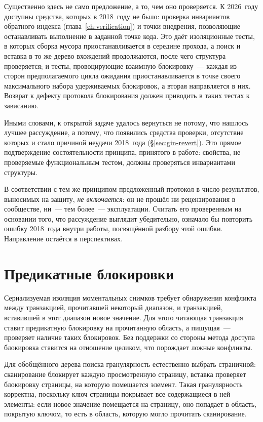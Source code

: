 Существенно здесь не само предложение, а то, чем оно проверяется. К 2026~году
доступны средства, которых в 2018~году не было: проверка инвариантов обратного
индекса (глава~\ref{ch:verification}) и точки внедрения, позволяющие
останавливать выполнение в заданной точке кода. Это даёт изоляционные тесты,
в которых сборка мусора приостанавливается в середине прохода, а поиск и
вставка в то же дерево вхождений продолжаются, после чего структура
проверяется; и тесты, провоцирующие взаимную блокировку~--- каждая из сторон
предполагаемого цикла ожидания приостанавливается в точке своего максимального
набора удерживаемых блокировок, а вторая направляется в них. Возврат к дефекту
протокола блокирования должен приводить в таких тестах к зависанию.

Иными словами, к открытой задаче удалось вернуться не потому, что нашлось
лучшее рассуждение, а потому, что появились средства проверки, отсутствие
которых и стало причиной неудачи 2018~года (§\ref{sec:gin-revert}). Это прямое
подтверждение состоятельности принципа, принятого в работе: свойства, не
проверяемые функциональным тестом, должны проверяться инвариантами структуры.

В соответствии с тем же принципом предложенный протокол в число результатов,
выносимых на защиту, \emph{не включается}: он не прошёл ни рецензирования в
сообществе, ни~--- тем более~--- эксплуатации. Считать его проверенным на
основании того, что рассуждение выглядит убедительно, означало бы повторить
ошибку 2018~года внутри работы, посвящённой разбору этой ошибки. Направление
остаётся в перспективах.

\section{Предикатные блокировки}
\label{sec:predicate-locks}

Сериализуемая изоляция моментальных снимков \cite{ports2012ssi} требует
обнаружения конфликта между транзакцией, прочитавшей некоторый диапазон, и
транзакцией, вставившей в этот диапазон новое значение. Для этого читающая
транзакция ставит предикатную блокировку на прочитанную область, а пишущая~---
проверяет наличие таких блокировок. Без поддержки со стороны метода доступа
блокировка ставится на отношение целиком, что порождает ложные конфликты.

Для обобщённого дерева поиска гранулярность естественно выбрать страничной:
сканирование блокирует каждую просмотренную страницу, вставка проверяет
блокировку страницы, на которую помещается элемент. Такая гранулярность
корректна, поскольку ключ страницы покрывает все содержащиеся в ней элементы:
если новое значение помещается на страницу, оно попадает в область, покрытую
ключом, то есть в область, которую могло прочитать сканирование.

